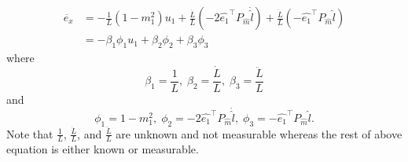 \begin{align}
\ddot{e_x}&=-\frac{1}{L}(1-m_1^2)u_1+\frac{\dot{L}}{L}(-2\hat{e_1}^{\top}P_{\hat{m}}\dot{\hat{l}})+\frac{\ddot{L}}{L}(-\hat{e_1}^{\top}P_{\hat{m}}\hat{l})
\\&=-\beta_1\phi_1u_1+\beta_2\phi_2+\beta_3\phi_3
\label{exddot}
\end{align} 
where
\begin{equation}
\beta_1=\frac{1}{L},\; \beta_2=\frac{\dot{L}}{L}, \; \beta_3=\frac{\ddot{L}}{L}
\end{equation}
and
\begin{equation}
\phi_1=1-m_1^2,\; \phi_2=-2\hat{e_1}^{\top}P_{\hat{m}}\dot{\hat{l}}, \; \phi_3=-\hat{e_1}^{\top}P_{\hat{m}}\hat{l}.
\end{equation}
Note that $\frac{1}{L}$, $\frac{\dot{L}}{L}$, and $\frac{\ddot{L}}{L}$ are unknown and not measurable whereas the rest of above equation is either known or measurable.

